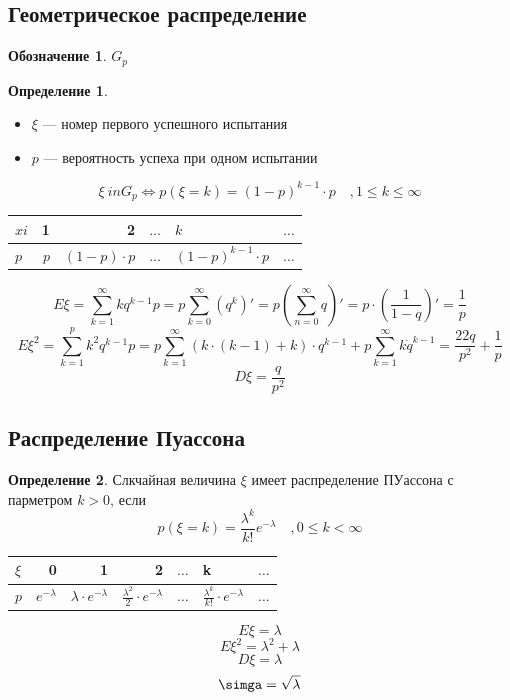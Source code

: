 \documentclass[english]{article}
\theoremstyle{plain}
\theoremstyle{remark}
\theoremstyle{definition}
\newtheorem*{definition}{Определение}
\newtheorem*{symb}{Обозначение}
\begin{document}
\subsection{Геометрическое распределение}
\label{sec:orgf0493a4}
\begin{symb}
\(G_p\)
\end{symb}
\begin{definition}
\-
\begin{itemize}
\item \(\xi\) --- номер первого успешного испытания
\item \(p\) --- вероятность успеха при одном испытании
\end{itemize}
\[ \xi \ in G_p \Leftrightarrow p(\xi = k) = (1 - p)^{k - 1}\cdot p\quad,1 \le k \le \infty \]
\end{definition}
\begin{center}
\begin{tabular}{l|rrlll}
\(xi\) & 1 & 2 & \(\dots\) & \(k\) & \(\dots\)\\
\hline
\(p\) & \(p\) & \((1 - p )\cdot p\) & \(\dots\) & \((1 - p)^{k - 1}\cdot p\) & \(\dots\)\\
\end{tabular}
\end{center}
\[ E\xi = \sum_{k = 1}^\infty k q^{k - 1}p = p\sum_{k = 0}^\infty (q^k)' = p\left(\sum_{n = 0}^\infty q\right)' = p\cdot\left(\frac{1}{1 - q}\right)' = \frac{1}{p} \]
\[ E\xi^2 = \sum_{k = 1}^p k^2 q^{k - 1} p = p\sum_{k = 1}^\infty\left(k\cdot(k - 1) + k\right)\cdot q^{k - 1} + p\sum_{k = 1}^\infty k\dot q^{k - 1} =  \frac{22q}{p^2} + \frac{1}{p} \]
\[ D\xi = \frac{q}{p^2} \]
\subsection{Распределение Пуассона}
\label{sec:orgde82a06}
\begin{definition}
Слкчайная величина \(\xi\) имеет распределение ПУассона с парметром \(k > 0\), если
\[ p(\xi = k) = \frac{\lambda^k}{k!}e^{-\lambda} \quad, 0\le k < \infty \]
\end{definition}
\begin{center}
\begin{tabular}{l|rrrlll}
\(\xi\) & 0 & 1 & 2 & \(\dots\) & k & \(\dots\)\\
\hline
\(p\) & \(e^{-\lambda}\) & \(\lambda\cdot e^{-\lambda}\) & \(\frac{\lambda^2}{2}\cdot e^{-\lambda}\) & \(\dots\) & \(\frac{\lambda^k}{k!}\cdot e^{-\lambda}\) & \(\dots\)\\
\end{tabular}
\end{center}
\[ E\xi = \lambda \]
\[ E\xi^2 = \lambda^2 + \lambda \]
\[ D\xi = \lambda \]
\[ \simga = \sqrt{\lambda} \]
\end{document}
